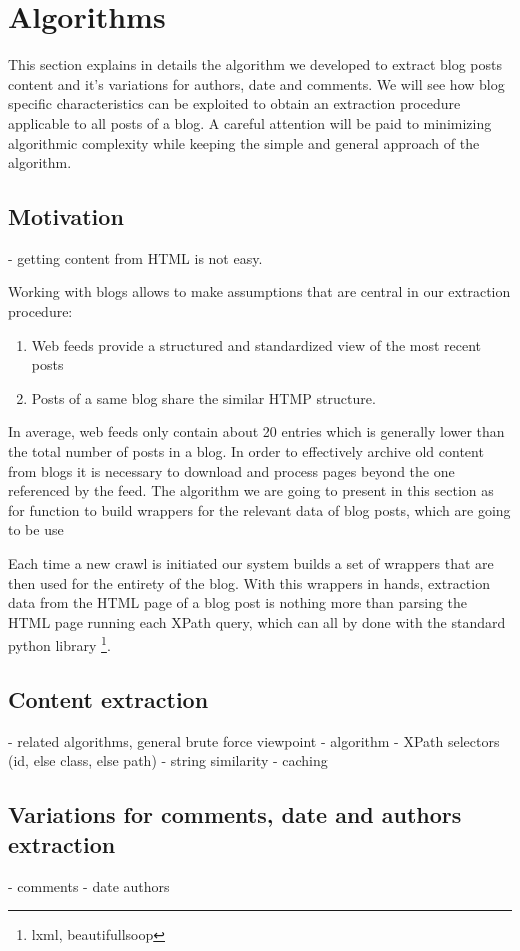 \section{Algorithms}

This section explains in details the algorithm we developed to extract blog posts content and it's variations for authors, date and comments. We will see how blog specific characteristics can be exploited to obtain an extraction procedure applicable to all posts of a blog. A careful attention will be paid to minimizing algorithmic complexity while keeping the simple and general approach of the algorithm.


\subsection{Motivation}
- getting content from HTML is not easy.
\cite{worldwidewebconsortiumw3c2002}

Working with blogs allows to make assumptions that are central in our extraction procedure:
\begin{enumerate}
  \item Web feeds provide a structured and standardized view of the most recent posts
  \item Posts of a same blog share the similar HTMP structure.
\end{enumerate}

In average, web feeds only contain about 20 entries \cite{french paper} which is generally lower than the total number of posts in a blog. In order to effectively archive old content from blogs it is necessary to download and process pages beyond the one referenced by the feed. The algorithm we are going to present in this section as for function to build wrappers for the relevant data of blog posts, which are going to be use

Each time a new crawl is initiated our system builds a set of wrappers that are then used for the entirety of the blog. With this wrappers in hands, extraction data from the HTML page of a blog post is nothing more than parsing the HTML page running each XPath query, which can all by done with the standard python library \footnote{lxml, beautifullsoop}.


\subsection{Content extraction}
- related algorithms, general brute force viewpoint
- algorithm
- XPath selectors (id, else class, else path)
- string similarity
- caching


\subsection{Variations for comments, date and authors extraction}
- comments
- date authors
